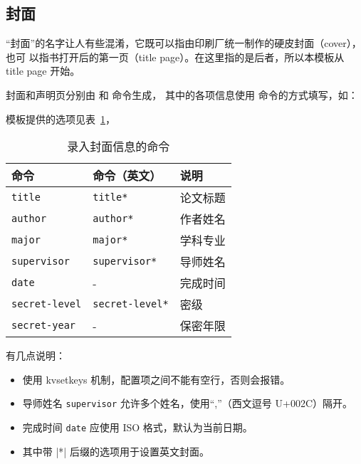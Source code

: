 \documentclass[a4paper]{ltxdoc}
\DeclareRobustCommand\pkg{\textsf}
\DeclareRobustCommand\opt{\texttt}
\begin{document}
\subsection{封面}

“封面”的名字让人有些混淆，它既可以指由印刷厂统一制作的硬皮封面（cover），也可
以指书打开后的第一页（title page）。在这里指的是后者，所以本模板从 title page
开始。

\DescribeMacro{\maketitle}
\DescribeMacro{\copyrightpage}
封面和声明页分别由  和  命令生成，
其中的各项信息使用  命令的方式填写，如：
\begin{latex}
\end{latex}
模板提供的选项见表~\ref{tab:covercmds}，
\begin{table}[htb]
  \centering\small
  \caption{录入封面信息的命令}
  \label{tab:covercmds}
  \begin{tabular}{lll}
    \toprule
    命令                & 命令（英文）         & 说明       \\
    \midrule
    \opt{title}         & \opt{title*}         & 论文标题   \\
    \opt{author}        & \opt{author*}        & 作者姓名   \\
    \opt{major}         & \opt{major*}         & 学科专业   \\
    \opt{supervisor}    & \opt{supervisor*}    & 导师姓名   \\
    \opt{date}          & -                    & 完成时间   \\
    \opt{secret-level}  & \opt{secret-level*}  & 密级       \\
    \opt{secret-year}   & -                    & 保密年限   \\
    \bottomrule
  \end{tabular}
\end{table}

有几点说明：
\begin{itemize}
  \item {} 使用 \pkg{kvsetkeys} 机制，配置项之间不能有空行，否则会报错。
  \item 导师姓名 \opt{supervisor} 允许多个姓名，使用“,”（西文逗号 U+002C）隔开。
  \item 完成时间 \opt{date} 应使用 ISO 格式，默认为当前日期。
  \item 其中带 |*| 后缀的选项用于设置英文封面。
\end{itemize}
\end{document}
